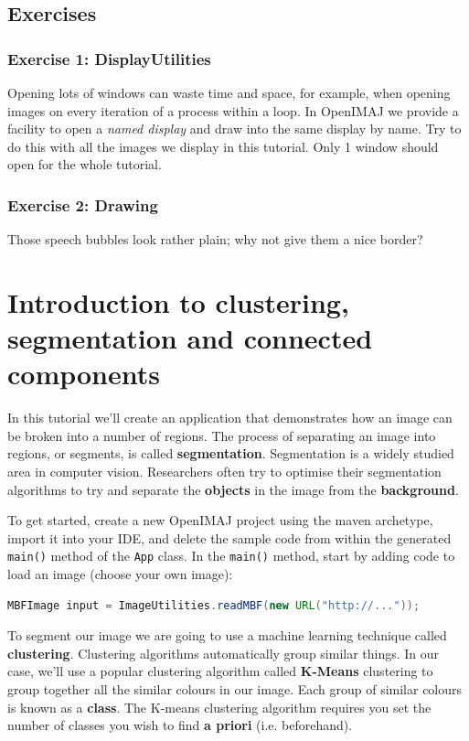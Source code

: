 \documentclass[10pt,a4paper,twoside,extrafontsizes]{memoir}
\begin{document}
\section*{Exercises}
\subsection*{Exercise 1: DisplayUtilities}
Opening lots of windows can waste time and space, for example, when opening images on every 
iteration of a process within a loop. In OpenIMAJ we provide a facility to open a 
\emph{named display} and draw into the same display by name. Try to do this with all the 
images we display in this tutorial. Only 1 window should open for the whole tutorial.
\subsection*{Exercise 2: Drawing}
Those speech bubbles look rather plain; why not give them a nice border?

\chapter{Introduction to clustering, segmentation and connected components}
In this tutorial we'll create an application that demonstrates how an image can be 
broken into a number of regions. The process of separating an image into regions, 
or segments, is called \textbf{segmentation}. Segmentation is a widely studied area in 
computer vision. Researchers often try to optimise their segmentation algorithms 
to try and separate the \textbf{objects} in the image from the \textbf{background}.

To get started, create a new OpenIMAJ project using the maven archetype, 
import it into your IDE, and delete the sample code from within the generated 
\verb+main()+ method of the \verb+App+ class. In the \verb+main()+ method, 
start by adding code to load an image (choose your own image):
\begin{lstlisting}[language=java]
MBFImage input = ImageUtilities.readMBF(new URL("http://..."));
\end{lstlisting}

To segment our image we are going to use a machine 
learning technique called 
\textbf{clustering}. Clustering algorithms automatically group similar things. In our 
case, we'll use a popular clustering algorithm called \textbf{K-Means} clustering to group 
together all the similar colours in our image. Each group of similar colours is 
known as a \textbf{class}. The K-means clustering algorithm requires you set the number 
of classes you wish to find \textbf{a priori} (i.e. beforehand). 
\end{document}
